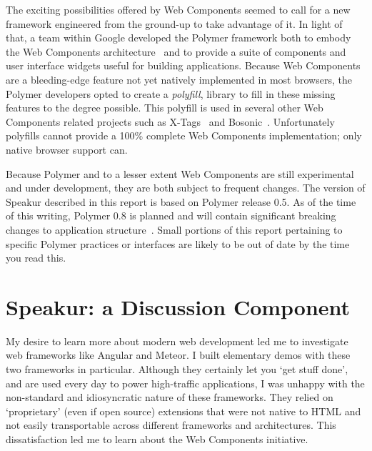 The exciting possibilities offered by Web Components seemed to call for a new framework engineered from the ground-up to take advantage of it.
In light of that, a team within Google developed the 
Polymer framework both to embody the Web Components 
architecture~\cite{polymercontributors2015} and 
to provide a suite of components and user interface widgets useful for building applications.
Because Web Components are a bleeding-edge feature not yet natively implemented in most browsers,
the Polymer developers opted to create a \textit{polyfill}, 
library to fill in these missing features to the degree possible.
This polyfill is used in several other Web Components related projects such as 
X-Tags~\cite{x-tagscontributors2015} and Bosonic~\cite{bosoniccontributors2014}.
Unfortunately polyfills cannot provide a 100\% complete Web Components implementation; 
only native browser support can.

Because Polymer and to a lesser extent Web Components are still experimental and under development, 
they are both subject to frequent changes.
The version of Speakur described in this report is based on Polymer release 0.5.
As of the time of this writing, Polymer 0.8 is planned and will contain significant breaking changes to application structure~\cite{michaelbleigh2015}.
Small portions of this report pertaining to specific Polymer practices or interfaces are likely to be out of date by the time you read this.

\section{Speakur: a Discussion Component}
My desire to learn more about modern web development led me to investigate web frameworks like Angular and Meteor.
I built elementary demos with these two frameworks in particular.
Although they certainly let you `get stuff done', and are used every day to power high-traffic applications, 
I was unhappy with the non-standard and idiosyncratic nature of these frameworks. 
They relied on `proprietary' (even if open source) extensions that were not native to HTML and not easily transportable across different frameworks and architectures.
This dissatisfaction led me to learn about the Web Components initiative.

